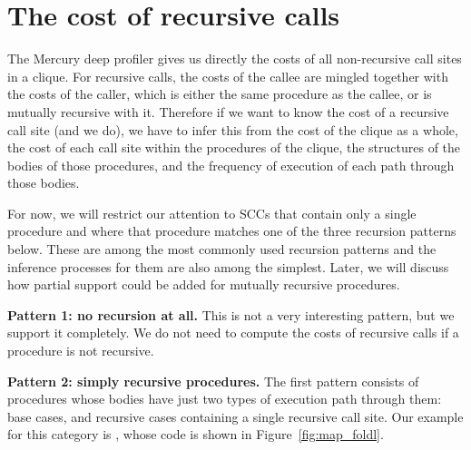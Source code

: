 


\section{The cost of recursive calls}
\label{sec:overlap_reccalls}


The Mercury deep profiler gives us directly
the costs of all non-recursive call sites in a clique.
For recursive calls,
the costs of the callee are mingled together
with the costs of the caller,
which is either the same procedure as the callee,
or is mutually recursive with it.
Therefore if we want to know the cost of a recursive call site (and we do),
we have to infer this
from the cost of the clique as a whole,
the cost of each call site within the procedures of the clique,
the structures of the bodies of those procedures,
and the frequency of execution of each path through those bodies.

For now, we will restrict our attention to SCCs
that contain only a single procedure and where that procedure matches one of
the three recursion patterns below.
These are among the most commonly used recursion patterns and the
inference processes for them are also among the simplest.
Later, we will discuss how partial support could be added for mutually
recursive procedures.

{\bf Pattern 1: no recursion at all.}
This is not a very interesting pattern, but we support it completely.
We do not need to compute the costs of recursive calls if a procedure is not
recursive.

{\bf Pattern 2: simply recursive procedures.}
The first pattern consists of procedures whose bodies
have just two types of execution path through them:
base cases, and recursive cases containing a single recursive call site.
Our example for this category is ,
whose code is shown in Figure~\ref{fig:map_foldl}.

